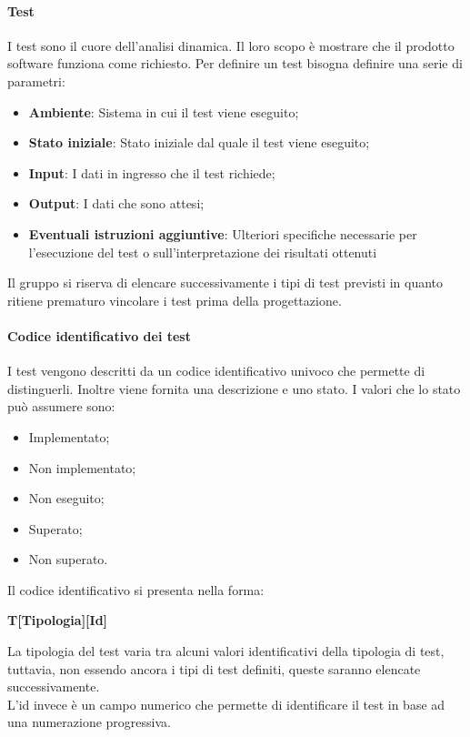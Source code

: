 \documentclass[../norme_di_progetto.tex]{subfiles}
\begin{document}
\paragraph{Test}
I test sono il cuore dell'analisi dinamica. Il loro scopo è mostrare che il prodotto software funziona come richiesto. Per definire un test bisogna definire una serie di parametri:
\begin{itemize}
    \item \textbf{Ambiente}: Sistema in cui il test viene eseguito;
    \item \textbf{Stato iniziale}: Stato iniziale dal quale il test viene eseguito;
    \item \textbf{Input}: I dati in ingresso che il test richiede;
    \item \textbf{Output}: I dati che sono attesi;
    \item \textbf{Eventuali istruzioni aggiuntive}: Ulteriori specifiche necessarie per l'esecuzione del test o sull'interpretazione dei risultati ottenuti
\end{itemize}

Il gruppo si riserva di elencare successivamente i tipi di test previsti in quanto ritiene prematuro vincolare i test prima della progettazione.

\paragraph{Codice identificativo dei test}
I test vengono descritti da un codice identificativo univoco che permette di distinguerli. Inoltre viene fornita una descrizione e uno stato. I valori che lo stato può assumere sono:
\begin{itemize}
    \item Implementato;
    \item Non implementato;
    \item Non eseguito;
    \item Superato;
    \item Non superato.
\end{itemize}
Il codice identificativo si presenta nella forma:
\begin{center}
    \textbf{T[Tipologia][Id]}
\end{center}
La tipologia del test varia tra alcuni valori identificativi della tipologia di test, tuttavia, non essendo ancora i tipi di test definiti, queste saranno elencate successivamente.\\
L'id invece è un campo numerico che permette di identificare il test in base ad una numerazione progressiva.
\end{document}
